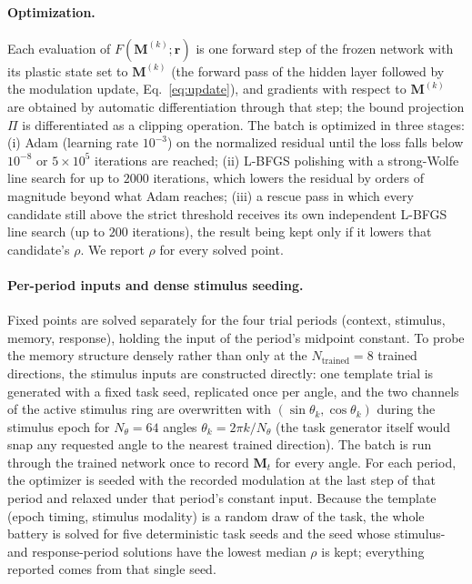 \documentclass{article}
\begin{document}
\paragraph{Optimization.}
Each evaluation of $F(\mathbf{M}^{(k)};\mathbf{r})$ is one forward step of the frozen network with its plastic state set to $\mathbf{M}^{(k)}$ (the forward pass of the hidden layer followed by the modulation update, Eq.~\eqref{eq:update}), and gradients with respect to $\mathbf{M}^{(k)}$ are obtained by automatic differentiation through that step; the bound projection $\Pi$ is differentiated as a clipping operation. The batch is optimized in three stages: (i) Adam (learning rate $10^{-3}$) on the normalized residual until the loss falls below $10^{-8}$ or $5\times10^{5}$ iterations are reached; (ii) L-BFGS polishing with a strong-Wolfe line search for up to $2000$ iterations, which lowers the residual by orders of magnitude beyond what Adam reaches; (iii) a rescue pass in which every candidate still above the strict threshold receives its own independent L-BFGS line search (up to $200$ iterations), the result being kept only if it lowers that candidate's $\rho$. We report $\rho$ for every solved point.

\paragraph{Per-period inputs and dense stimulus seeding.}
Fixed points are solved separately for the four trial periods (context, stimulus, memory, response), holding the input of the period's midpoint constant. To probe the memory structure densely rather than only at the $N_{\text{trained}} = 8$ trained directions, the stimulus inputs are constructed directly: one template trial is generated with a fixed task seed, replicated once per angle, and the two channels of the active stimulus ring are overwritten with $(\sin\theta_k, \cos\theta_k)$ during the stimulus epoch for $N_\theta = 64$ angles $\theta_k = 2\pi k/N_\theta$ (the task generator itself would snap any requested angle to the nearest trained direction). The batch is run through the trained network once to record $\mathbf{M}_t$ for every angle. For each period, the optimizer is seeded with the recorded modulation at the last step of that period and relaxed under that period's constant input. Because the template (epoch timing, stimulus modality) is a random draw of the task, the whole battery is solved for five deterministic task seeds and the seed whose stimulus- and response-period solutions have the lowest median $\rho$ is kept; everything reported comes from that single seed.
\end{document}
